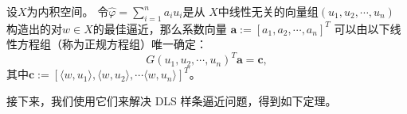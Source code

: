 
\begin{thm}
  \label{thm:FINALNormalEquation}
  设$X$为内积空间。
  令$\hat{\varphi}=\sum_{i=1}^{n}a_{i}u_{i}$是从
  $X$中线性无关的向量组$(u_{1},u_{2},\cdots,u_{n})$
  构造出的对$w\in X$的最佳逼近，那么系数向量
  $\mathbf{a}:=[a_{1},a_{2},\cdots,a_{n}]^{T}$
  可以由以下线性方程组（称为正规方程组）唯一确定：
  \begin{equation}
    \label{eq:FINALNormalEquation}
    G(u_{1},u_{2},\cdots,u_{n})^{T}\mathbf{a}=\mathbf{c},
  \end{equation}
  其中$\mathbf{c}:=[\langle w,u_{1}\rangle,
                    \langle w,u_{2}\rangle,\cdots
                    \langle w,u_{n}\rangle]^{T}$。
\end{thm}

接下来，我们使用它们来解决 DLS 样条逼近问题，得到如下定理。


